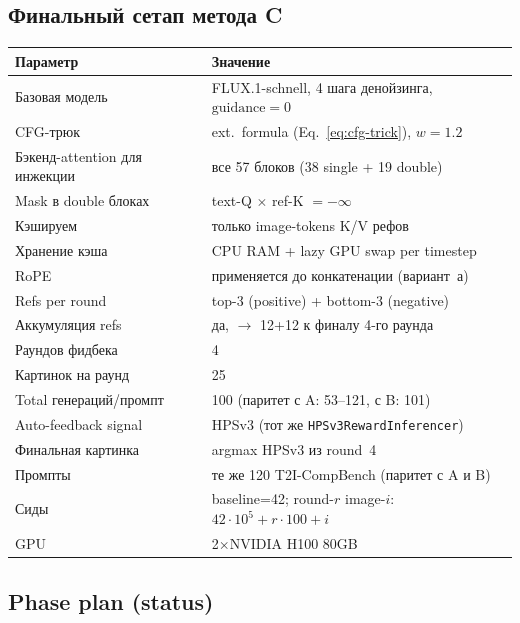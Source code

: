 \documentclass[11pt,a4paper]{article}
\begin{document}
\subsection{Финальный сетап метода C}

\begin{center}
\renewcommand{\arraystretch}{1.1}
\footnotesize
\begin{tabular}{ll}
\toprule
Параметр & Значение \\
\midrule
Базовая модель & FLUX.1-schnell, 4 шага денойзинга, $\text{guidance}=0$ \\
CFG-трюк & ext.\ formula (Eq.~\ref{eq:cfg-trick}), $w=1.2$ \\
Бэкенд-attention для инжекции & все 57 блоков (38 single + 19 double) \\
Mask в double блоках & text-Q $\times$ ref-K $= -\infty$ \\
Кэшируем & только image-tokens K/V рефов \\
Хранение кэша & CPU RAM + lazy GPU swap per timestep \\
RoPE & применяется до конкатенации (вариант~а) \\
Refs per round & top-3 (positive) + bottom-3 (negative) \\
Аккумуляция refs & да, $\to$ 12+12 к финалу 4-го раунда \\
Раундов фидбека & 4 \\
Картинок на раунд & 25 \\
Total генераций/промпт & 100 (паритет с A: 53--121, с B: 101) \\
Auto-feedback signal & HPSv3 (тот же \texttt{HPSv3RewardInferencer}) \\
Финальная картинка & argmax HPSv3 из round~4 \\
Промпты & те же 120 T2I-CompBench (паритет с A и B) \\
Сиды & baseline=42; round-$r$ image-$i$: $42\cdot 10^5 + r \cdot 100 + i$ \\
GPU & 2$\times$NVIDIA H100 80GB \\
\bottomrule
\end{tabular}
\end{center}

\subsection{Phase plan (status)}
\end{document}
